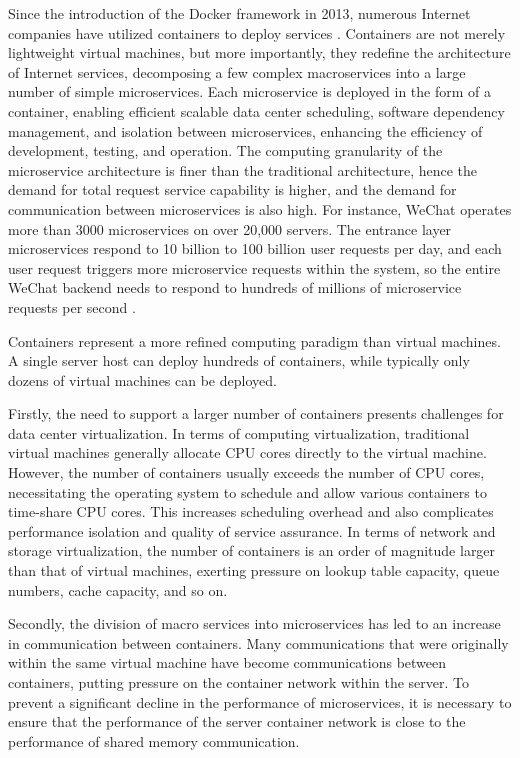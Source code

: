 Since the introduction of the Docker framework in 2013, numerous Internet companies have utilized containers to deploy services \cite{bernstein2014containers}. Containers are not merely lightweight virtual machines, but more importantly, they redefine the architecture of Internet services, decomposing a few complex macroservices into a large number of simple microservices. Each microservice is deployed in the form of a container, enabling efficient scalable data center scheduling, software dependency management, and isolation between microservices, enhancing the efficiency of development, testing, and operation. The computing granularity of the microservice architecture is finer than the traditional architecture, hence the demand for total request service capability is higher, and the demand for communication between microservices is also high. For instance, WeChat operates more than 3000 microservices on over 20,000 servers. The entrance layer microservices respond to 10 billion to 100 billion user requests per day, and each user request triggers more microservice requests within the system, so the entire WeChat backend needs to respond to hundreds of millions of microservice requests per second \cite{zhou2018overload}.

Containers represent a more refined computing paradigm than virtual machines. A single server host can deploy hundreds of containers, while typically only dozens of virtual machines can be deployed. 

Firstly, the need to support a larger number of containers presents challenges for data center virtualization. In terms of computing virtualization, traditional virtual machines generally allocate CPU cores directly to the virtual machine. However, the number of containers usually exceeds the number of CPU cores, necessitating the operating system to schedule and allow various containers to time-share CPU cores. This increases scheduling overhead and also complicates performance isolation and quality of service assurance. In terms of network and storage virtualization, the number of containers is an order of magnitude larger than that of virtual machines, exerting pressure on lookup table capacity, queue numbers, cache capacity, and so on.

Secondly, the division of macro services into microservices has led to an increase in communication between containers. Many communications that were originally within the same virtual machine have become communications between containers, putting pressure on the container network within the server. To prevent a significant decline in the performance of microservices, it is necessary to ensure that the performance of the server container network is close to the performance of shared memory communication.

